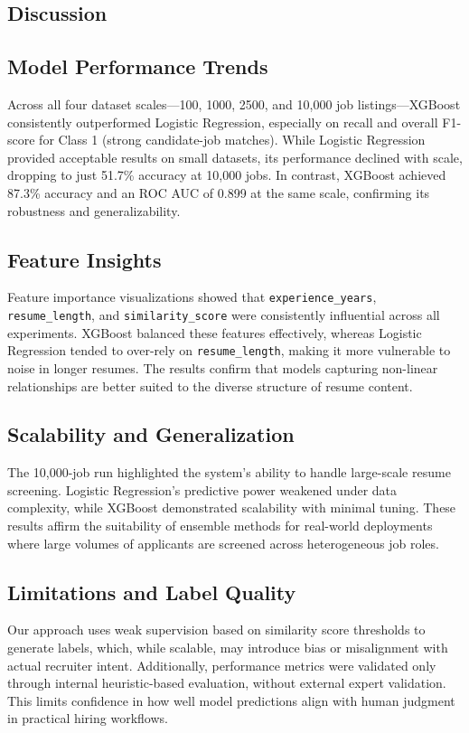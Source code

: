 \documentclass[a4paper]{article}
\begin{document}
\begin{multicols}{2}
\section{Discussion}

\subsection{Model Performance Trends}
Across all four dataset scales—100, 1000, 2500, and 10,000 job listings—XGBoost consistently outperformed Logistic Regression, especially on recall and overall F1-score for Class 1 (strong candidate-job matches). While Logistic Regression provided acceptable results on small datasets, its performance declined with scale, dropping to just 51.7\% accuracy at 10,000 jobs. In contrast, XGBoost achieved 87.3\% accuracy and an ROC AUC of 0.899 at the same scale, confirming its robustness and generalizability.

\subsection{Feature Insights}
Feature importance visualizations showed that \texttt{experience\_years}, \texttt{resume\_length}, and \texttt{similarity\_score} were consistently influential across all experiments. XGBoost balanced these features effectively, whereas Logistic Regression tended to over-rely on \texttt{resume\_length}, making it more vulnerable to noise in longer resumes. The results confirm that models capturing non-linear relationships are better suited to the diverse structure of resume content.

\subsection{Scalability and Generalization}
The 10,000-job run highlighted the system's ability to handle large-scale resume screening. Logistic Regression’s predictive power weakened under data complexity, while XGBoost demonstrated scalability with minimal tuning. These results affirm the suitability of ensemble methods for real-world deployments where large volumes of applicants are screened across heterogeneous job roles.

\subsection{Limitations and Label Quality}
Our approach uses weak supervision based on similarity score thresholds to generate labels, which, while scalable, may introduce bias or misalignment with actual recruiter intent. Additionally, performance metrics were validated only through internal heuristic-based evaluation, without external expert validation. This limits confidence in how well model predictions align with human judgment in practical hiring workflows.


\end{multicols}
\end{document}
